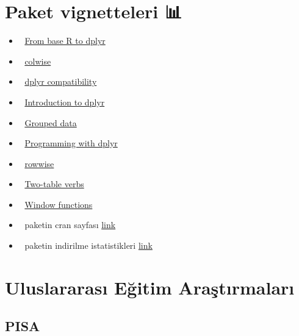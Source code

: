 \documentclass[
  oneside]{book}
\begin{document}
\hypertarget{paket-vignetteleri}{%
\section{Paket vignetteleri 📊}\label{paket-vignetteleri}}

\begin{itemize}
\item
  🔗 \href{https://cran.r-project.org/web/packages/dplyr/vignettes/base.html}{From base R to dplyr}
\item
  🔗 \href{https://cran.r-project.org/web/packages/dplyr/vignettes/colwise.html}{colwise}
\item
  🔗 \href{https://cran.r-project.org/web/packages/dplyr/vignettes/compatibility.html}{dplyr compatibility}
\item
  🔗 \href{https://cran.r-project.org/web/packages/dplyr/vignettes/dplyr.html}{Introduction to dplyr}
\item
  🔗 \href{https://cran.r-project.org/web/packages/dplyr/vignettes/grouping.html}{Grouped data}
\item
  🔗 \href{https://cran.r-project.org/web/packages/dplyr/vignettes/programming.html}{Programming with dplyr}
\item
  🔗 \href{https://cran.r-project.org/web/packages/dplyr/vignettes/rowwise.html}{rowwise}
\item
  🔗 \href{https://cran.r-project.org/web/packages/dplyr/vignettes/two-table.html}{Two-table verbs}
\item
  🔗 \href{https://cran.r-project.org/web/packages/dplyr/vignettes/window-functions.html}{Window functions}
\item
  🔗 paketin cran sayfası \href{https://cran.r-project.org/web/packages/dplyr/index.html}{link}
\item
  🔗 paketin indirilme istatistikleri \href{https://ipub.com/dev-corner/apps/r-package-downloads/}{link}
\end{itemize}

\hypertarget{uluslararasux131-eux11fitim-araux15ftux131rmalarux131}{%
\section{Uluslararası Eğitim Araştırmaları}\label{uluslararasux131-eux11fitim-araux15ftux131rmalarux131}}

\hypertarget{pisa}{%
\subsection{PISA}\label{pisa}}
\end{document}
